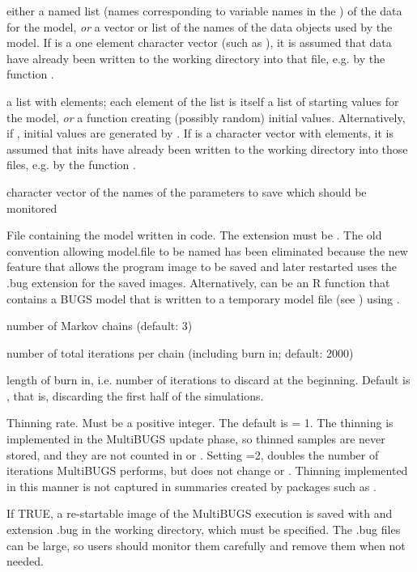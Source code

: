 \begin{Arguments}
\begin{ldescription}
\item[\code{data}] either a named list (names corresponding to variable names
in the ) of the data for the  model,
\emph{or} a vector or list of the names of the data objects used by
the model. If  is a one element character vector (such as ),
it is assumed that data have already been written to the working directory into that file,
e.g. by the function .
\item[\code{inits}] a list with  elements; each element of the
list is itself a list of starting values for the  model,
\emph{or} a function creating (possibly random) initial values.
Alternatively, if , initial values are generated
by . If  is a character vector with  elements,
it is assumed that inits have already been written to the working directory into those files,
e.g. by the function .
\item[\code{parameters.to.save}] character vector of the names of the
parameters to save which should be monitored
\item[\code{model.file}] File containing the model written in  code.
The extension must be .
The old convention allowing model.file to be named  has been eliminated
because the new  feature that allows the program image
to be saved and later restarted uses the .bug extension for the saved
images.
Alternatively,  can be an R function that contains a BUGS model that is written to a
temporary model file (see ) using .
\item[\code{n.chains}] number of Markov chains (default: 3)
\item[\code{n.iter}] number of total iterations per chain (including burn in;
default: 2000)
\item[\code{n.burnin}] length of burn in, i.e. number of iterations to
discard at the beginning. Default is , that is,
discarding the first half of the simulations.
\item[\code{n.thin}] Thinning rate. Must be a positive integer. The default is
 = 1. The thinning is implemented in the MultiBUGS update phase, so
thinned samples are never stored, and they are not counted in  or
.  Setting =2, doubles the number of iterations MultiBUGS
performs, but does not change  or .  Thinning implemented
in this manner is not captured in summaries created by packages such as .
\item[\code{saveExec}] If TRUE, a re-startable image of the MultiBUGS execution is
saved with  and extension .bug in the working
directory, which must be specified.  The .bug files can be large, so
users should monitor them carefully and remove them when not needed.


\end{ldescription}
\end{Arguments}
